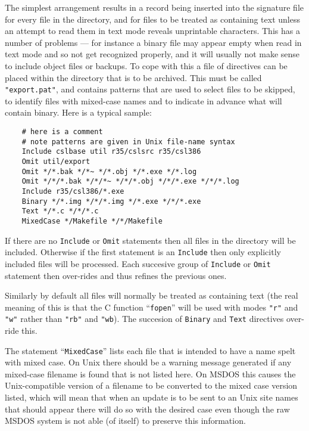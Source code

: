 \begin{description}
The simplest arrangement results in a record being inserted into the
signature file for every file in the directory, and for files to be treated
as containing text unless an attempt to read them in text mode reveals
unprintable characters.  This has a number of problems --- for instance
a binary file may appear empty when read in text mode and so not get
recognized properly, and it will usually not make sense to include
object files or backups.  To cope with this a file of directives can
be placed within the directory that is to be archived.  This must be
called {\tt "export.pat"}, and contains patterns that are used to
select files to be skipped, to identify files with mixed-case names and
to indicate in advance what will contain binary.  Here is a typical
sample:
\begin{verbatim}
    # here is a comment
    # note patterns are given in Unix file-name syntax
    Include cslbase util r35/cslsrc r35/csl386
    Omit util/export
    Omit */*.bak */*~ */*.obj */*.exe */*.log
    Omit */*/*.bak */*/*~ */*/*.obj */*/*.exe */*/*.log
    Include r35/csl386/*.exe
    Binary */*.img */*/*.img */*.exe */*/*.exe
    Text */*.c */*/*.c
    MixedCase */Makefile */*/Makefile
\end{verbatim}

If there are no {\tt Include} or {\tt Omit} statements then all files
in the directory will be included.  Otherwise if the first statement is
an {\tt Include} then only explicitly included files will be processed.
Each succesive group of {\tt Include} or {\tt Omit} statement then
over-rides and thus refines the previous ones.

Similarly by default all files will normally be treated as containing text
(the real meaning of this is that the C function ``{\tt fopen}'' will be used
with modes {\tt "r"} and {\tt "w"} rather than {\tt "rb"} and {\tt "wb}).
The succesion of {\tt Binary} and {\tt Text} directives over-ride this.

The statement ``{\tt MixedCase}'' lists each file that is intended to
have a name spelt with mixed case.  On Unix there should be a warning message
generated if any mixed-case filename is found that is not listed here.
On MSDOS this causes the Unix-compatible version of a filename to be
converted to the mixed case version listed, which will mean that when an
update is to be sent to an Unix site names that should appear there will
do so with the desired case even though the raw MSDOS system is not
able (of itself) to preserve this information.


\end{description}
